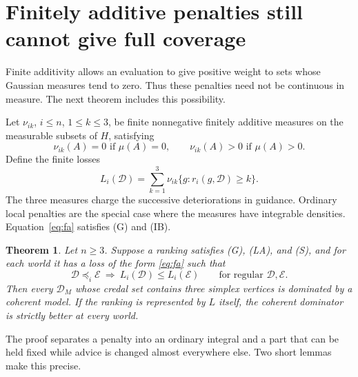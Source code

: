 \documentclass[11pt]{article}
\newtheorem{theorem}{Theorem}
\theoremstyle{remark}\newtheorem{remark}[theorem]{Remark}
\newcommand{\Dscr}{\mathcal D}
\newcommand{\Escr}{\mathcal E}
\begin{document}
\section{Finitely additive penalties still cannot give full coverage}

Finite additivity allows an evaluation to give positive weight to sets
whose Gaussian measures tend to zero. Thus these penalties need not be
continuous in measure. The next theorem includes this possibility.

Let $\nu_{ik}$, $i\le n$, $1\le k\le3$, be finite nonnegative finitely
additive measures on the measurable subsets of $H$, satisfying
\begin{equation}
 \nu_{ik}(A)=0\text{ if }\mu(A)=0,
 \qquad \nu_{ik}(A)>0\text{ if }\mu(A)>0.
 \label{eq:positive}
\end{equation}
Define the finite losses
\begin{equation}
 L_i(\Dscr)=\sum_{k=1}^3\nu_{ik}\{g:r_i(g,\Dscr)\ge k\}.
 \label{eq:fa}
\end{equation}
The three measures charge the successive deteriorations in guidance.
Ordinary local penalties are the special case where the measures have
integrable densities. Equation~\eqref{eq:fa} satisfies (G) and (IB).

\begin{theorem}\label{thm:fa}
Let $n\ge3$. Suppose a ranking satisfies (G), (LA), and (S), and for each
world it has a loss of the form \eqref{eq:fa} such that
\begin{equation}
 \Dscr\preceq_i\Escr\ \Longrightarrow\ L_i(\Dscr)\le L_i(\Escr)
 \qquad\text{for regular }\Dscr,\Escr.
 \label{eq:weak}
\end{equation}
Then every $\Dscr_M$ whose credal set contains three simplex vertices is
dominated by a coherent model. If the ranking is represented by $L$ itself,
the coherent dominator is strictly better at every world.
\end{theorem}

The proof separates a penalty into an ordinary integral and a part that
can be held fixed while advice is changed almost everywhere else. Two
short lemmas make this precise.
\end{document}
